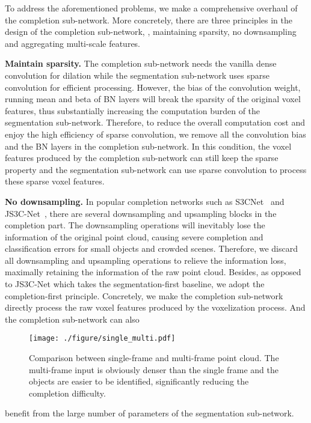 \documentclass[10pt,twocolumn,letterpaper]{article}
\begin{document}
To address the aforementioned problems, we make a comprehensive overhaul of the completion sub-network. More concretely, there are three principles in the design of the completion sub-network, \ie, maintaining sparsity, no downsampling and aggregating multi-scale features.

\noindent \textbf{Maintain sparsity.} The completion sub-network needs the vanilla dense convolution for dilation while the segmentation sub-network uses sparse convolution for efficient processing. However, the bias of the convolution weight, running mean and beta of BN layers will break the sparsity of the original voxel features, thus substantially increasing the computation burden of the segmentation sub-network. Therefore, to reduce the overall computation cost and enjoy the high efficiency of sparse convolution, we remove all the convolution bias and the BN layers in the completion sub-network. In this condition, the voxel features produced by the completion sub-network can still keep the sparse property and the segmentation sub-network can use sparse convolution to process these sparse voxel features. 

\noindent \textbf{No downsampling.} In popular completion networks such as S3CNet~\cite{s3cnet} and JS3C-Net~\cite{js3cnet}, there are several downsampling and upsampling blocks in the completion part. The downsampling operations will inevitably lose the information of the original point cloud, causing severe completion and classification errors for small objects and crowded scenes. Therefore, we discard all downsampling and upsampling operations to relieve the information loss, maximally retaining the information of the raw point cloud. Besides, as opposed to JS3C-Net which takes the segmentation-first baseline, we adopt the completion-first principle. Concretely, we make the completion sub-network directly process the raw voxel features produced by the voxelization process. And the completion sub-network can also 

\begin{figure}[!ht]
 \centering
 \texttt{[image: ./figure/single\_multi.pdf]}
 \vskip -0.2cm
 \caption{Comparison between single-frame and multi-frame point cloud. The multi-frame input is obviously denser than the single frame and the objects are easier to be identified, significantly reducing the completion difficulty.}
 \centering
 \vskip -0.2cm
 \label{fig:single_multi}
\end{figure}

\noindent benefit from the large number of parameters of the segmentation sub-network.
\end{document}
